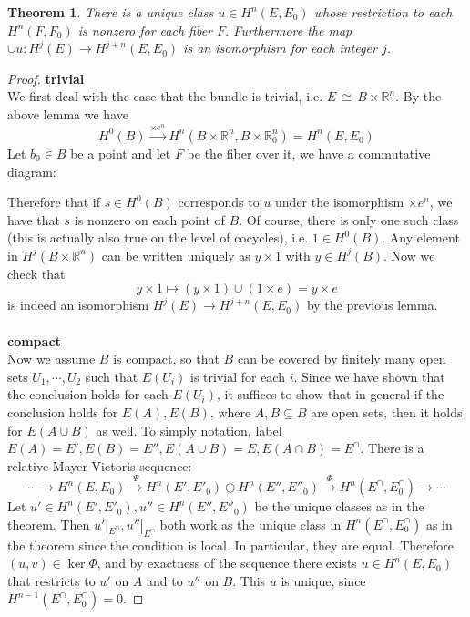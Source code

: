 \documentclass[12pt]{article}
\theoremstyle{plain}
\newtheorem{theorem}[equation]{Theorem}
\theoremstyle{definition}
\newcommand{\IR}{\mathbb{R}}
\newcommand\iso{\,{\cong}\,}
\newcommand{\<}{\langle}
\renewcommand{\>}{\rangle}
\begin{document}
\begin{theorem}
\label{ThomIsoMod2}
There is a unique class $u \in H^n(E, E_0)$ whose restriction to each $H^n(F, F_0)$ is nonzero for each fiber $F$. Furthermore the map $\cup u : H^j(E) \to H^{j + n}(E, E_0)$ is an isomorphism for each integer $j$. 
\end{theorem}
\begin{proof}
\textbf{trivial}\\
We first deal with the case that the bundle is trivial, i.e. $E \iso B \times \IR^n$. By the above lemma we have $$H^0(B) \stackrel{\times e^n}{\longrightarrow} H^{n}(B \times \IR^n, B \times \IR^n_0) = H^n(E, E_0)$$
Let $b_0 \in B$ be a point and let $F$ be the fiber over it, we have a commutative diagram: 

Therefore that if $s \in H^0(B)$ corresponds to $u$ under the isomorphism $\times e^n$, we have that $s$ is nonzero on each point of $B$. Of course, there is only one such class (this is actually also true on the level of cocycles), i.e. $1 \in H^0(B)$. Any element in $H^j (B \times \IR^n)$ can be written uniquely as $y \times 1$ with $y \in H^j(B)$. Now we check that 
$$ y \times 1 \mapsto (y \times 1)\cup (1 \times e) = y \times e$$
is indeed an isomorphism $H^j(E) \to H^{j + n}(E, E_0)$ by the previous lemma. \\\\
\textbf{compact}\\
Now we assume $B$ is compact, so that $B$ can be covered by finitely many open sets $U_1, \cdots, U_2$ such that $E(U_i)$ is trivial for each $i$. Since we have shown that the conclusion holds for each $E(U_i)$, it suffices to show that in general if the conclusion holds for $E(A), E(B)$, where $A, B \subseteq B$ are open sets, then it holds for $E(A \cup B)$ as well. To simply notation, label $E(A) = E', E(B) = E'', E(A\cup B ) = E, E(A \cap B) = E^\cap$. There is a relative Mayer-Vietoris sequence:
$$ \cdots \to H^n(E, E_0) \stackrel{\Psi}{\to} H^n(E', E'_0) \oplus H^n(E'', E''_0) \stackrel{\Phi}{\to} H^n(E^\cap, E^\cap_0) \to \cdots $$ 
Let $u' \in H^n(E', E'_0), u'' \in H^n(E'', E''_0)$ be the unique classes as in the theorem. Then $u'|_{E^\cap}, u''|_{E^\cap}$ both work as the unique class in $H^n(E^\cap, E^\cap_0)$ as in the theorem since the condition is local. In particular, they are equal. Therefore $(u, v) \in \ker \Phi$, and by exactness of the sequence there exists $u \in H^n(E, E_0)$ that restricts to $u'$ on $A $ and to $u''$ on $B$. This $u$ is unique, since $H^{n - 1}(E^\cap, E^\cap_0) = 0$.


\end{proof}
\end{document}
